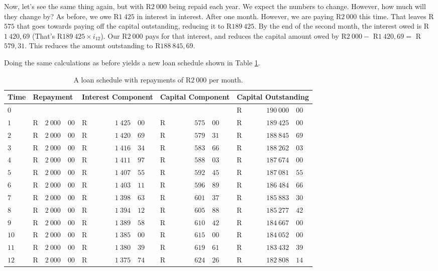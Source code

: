 Now, let's see the same thing again, but with R$2~000$ being repaid each year. We expect the numbers to change. However, how much will they change by? As before, we owe R$1~425$ in interest in interest. After one month. However, we are paying R$2~000$ this time. That leaves R$575$ that goes towards paying off the capital outstanding, reducing it to R$189~425$. By the end of the second month, the interest owed is R$1~420,69$ (That's R$189~425\times i_{12}$). Our R$2~000$ pays for that interest, and reduces the capital amount owed by R$2~000 -$ R$1~420,69 =$ R$579,31$. This reduces the amount outstanding to R$188~845,69$.

Doing the same calculations as before yields a new loan schedule shown in Table \ref{tb:lschedule2}.

\begin{table}
\begin{center}
\begin{tabular}{|l|lr@{,}l|lr@{,}l|lr@{,}l|lr@{,}l|}
\hline
Time&\multicolumn{3}{l|}{Repayment}&\multicolumn{3}{p{2cm}|}{Interest Component}&\multicolumn{3}{p{2cm}|}{Capital Component}&\multicolumn{3}{p{2.5cm}|}{Capital Outstanding}\\
\hline
\hline
$0$&\multicolumn{3}{l|}{}&\multicolumn{3}{r|}{}&\multicolumn{3}{r|}{}&R&$190~000$&$00$\\
$1$&R&$2~000$&$00$&R&$1~425$&$00$&R&$575$&$00$&R&$189~425$&$00$\\
$2$&R&$2~000$&$00$&R&$1~420$&$69$&R&$579$&$31$&R&$188~845$&$69$\\
$3$&R&$2~000$&$00$&R&$1~416$&$34$&R&$583$&$66$&R&$188~262$&$03$\\
$4$&R&$2~000$&$00$&R&$1~411$&$97$&R&$588$&$03$&R&$187~674$&$00$\\
$5$&R&$2~000$&$00$&R&$1~407$&$55$&R&$592$&$45$&R&$187~081$&$55$\\
$6$&R&$2~000$&$00$&R&$1~403$&$11$&R&$596$&$89$&R&$186~484$&$66$\\
$7$&R&$2~000$&$00$&R&$1~398$&$63$&R&$601$&$37$&R&$185~883$&$30$\\
$8$&R&$2~000$&$00$&R&$1~394$&$12$&R&$605$&$88$&R&$185~277$&$42$\\
$9$&R&$2~000$&$00$&R&$1~389$&$58$&R&$610$&$42$&R&$184~667$&$00$\\
$10$&R&$2~000$&$00$&R&$1~385$&$00$&R&$615$&$00$&R&$184~052$&$00$\\
$11$&R&$2~000$&$00$&R&$1~380$&$39$&R&$619$&$61$&R&$183~432$&$39$\\
$12$&R&$2~000$&$00$&R&$1~375$&$74$&R&$624$&$26$&R&$182~808$&$14$\\
\hline
\end{tabular}
\end{center}
\caption{A loan schedule with repayments of R$2~000$ per month.}
\label{tb:lschedule2}
\end{table}

